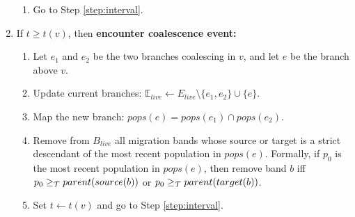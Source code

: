 \documentclass[11pt]{article}
\newcommand{\E}{\mathbb{E}}
\newcommand{\1}{\mathbbm{1}}
\begin{document}
\begin{enumerate}
\begin{enumerate}
    \item Go to Step \ref{step:interval}.
  \end{enumerate}
  
  \item If $t \geq t(v)$, then \textbf{encounter coalescence event:}
  \begin{enumerate}
    \item \label{step:coal} Let $e_1$ and $e_2$ be the two branches coalescing in $v$, and let $e$ be the branch above $v$.
    \item Update current branches: $\E_{live}\leftarrow E_{live}\setminus\{e_1,e_2\}\cup\{e\}$.
    \item \label{step:coal_mapping} Map the new branch: $pops(e) = pops(e_1)\cap pops(e_2)$.
    \item \label{step:ub_coal} Remove from $B_{live}$ all migration bands whose source or target is a strict descendant of the most recent population in $pops(e)$.
    Formally, if $p_0$ is the most recent population in $pops(e)$, then remove band $b$ iff $p_0 \geq_{\mathcal{T}} parent(source(b))$ or $p_0\geq_{\mathcal{T}} parent(target(b))$.
    \item Set $t\leftarrow t(v)$ and go to Step \ref{step:interval}.
  \end{enumerate}
  
\end{enumerate}
\end{document}
